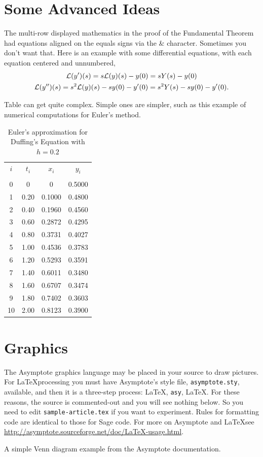 \documentclass[10pt,]{article}
\theoremstyle{plain}
\theoremstyle{definition}
\begin{document}
\section{Some Advanced Ideas}\label{section-6}
%
The multi-row displayed mathematics in the proof of the Fundamental Theorem had equations aligned on the equals signs via the \& character.  Sometimes you don't want that.  Here is an example with some differential equations, with each equation centered and unnumbered,
            \begin{gather}
{\mathcal L}(y')(s) = s {\mathcal L}(y)(s) - y(0) = s Y(s) - y(0)\notag\\
{\mathcal L}(y'')(s) = s^2 {\mathcal L}(y)(s) - sy(0) - y'(0)= s^2 Y(s) - sy(0) - y'(0).\notag
\end{gather}
%
\par Table can get quite complex.  Simple ones are simpler, such as this example of numerical computations for Euler's method.
%
\begin{table}[thb]\centering
\label{table-1}\begin{tabular}{*{4}{c}}
\hline\hline $i$&$t_i$&$x_i$&$y_i$\\
\\\hline\hline 0&0&0&0.5000\\
1&0.20&0.1000&0.4800\\
2&0.40&0.1960&0.4560\\
3&0.60&0.2872&0.4295\\
4&0.80&0.3731&0.4027\\
5&1.00&0.4536&0.3783\\
6&1.20&0.5293&0.3591\\
7&1.40&0.6011&0.3480\\
8&1.60&0.6707&0.3474\\
9&1.80&0.7402&0.3603\\
10&2.00&0.8123&0.3900\\
\end{tabular}
\caption{Euler's approximation for Duffing's Equation with $h = 0.2$}
\end{table}
%
\typeout{************************************************}
\typeout{************************************************}
%
\section{Graphics}\label{section-7}
%
The Asymptote graphics language may be placed in your source to draw pictures.  For \LaTeX  processing you must have Asymptote's style file, \verb?asymptote.sty?, available, and then it is a three-step process: \LaTeX , \verb?asy?, \LaTeX .  For these reasons, the source is commented-out and you will see nothing below.  So you need to edit \verb?sample-article.tex? if you want to experiment.  Rules for formatting code are identical to those for Sage code.  For more on Asymptote and \LaTeX  see \url{http://asymptote.sourceforge.net/doc/LaTeX-usage.html}.
%
\par A simple Venn diagram example from the Asymptote documentation.
%
\typeout{************************************************}
\typeout{************************************************}
%
\end{document}
